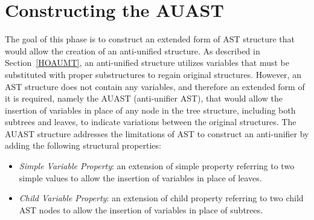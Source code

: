 


\section{Constructing the AUAST} \label{AUAST}


The goal of this phase is to construct an extended form of AST structure that would allow the creation of an anti-unified structure. As described in Section~\ref{HOAUMT}, an anti-unified structure utilizes variables that must be substituted with proper substructures to regain original structures. However, an AST structure does not contain any variables, and therefore an extended form of it is required, namely the AUAST (anti-unifier AST), that would allow the insertion of variables in place of any node in the tree structure, including both subtrees and leaves, to indicate variations between the original structures. The AUAST structure addresses the limitations of AST to construct an anti-unifier by adding the following structural properties:

\begin{itemize} [leftmargin=.5in]
\item \textit{Simple Variable Property}: an extension of simple property referring to two simple values to allow the insertion of variables in place of leaves.
\end{itemize}
\begin{itemize} [leftmargin=.5in]
\item \textit{Child Variable Property}: an extension of child property referring to two child AST nodes to allow the insertion of variables in place of subtrees.
\end{itemize}

